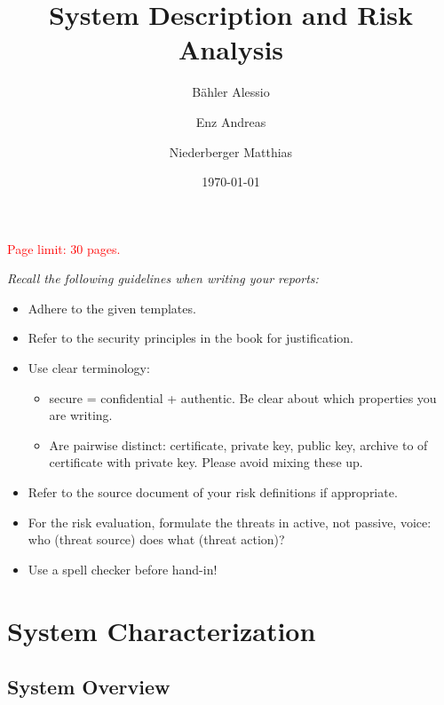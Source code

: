 \documentclass[english]{article}
\title{\huge\sffamily\bfseries System Description and Risk Analysis}
\author{B\"ahler Alessio \and Enz Andreas \and Niederberger Matthias}
\date{\today}
\begin{document}
\maketitle

\begin{center}
{\large\textcolor{red}{Page limit: 30 pages.}}
\end{center}

\tableofcontents
\pagebreak

\begin{framed}
\noindent
{\it
Recall the following guidelines when writing your reports:
\begin{itemize}
\item Adhere to the given templates.

\item Refer to the security principles in the book for justification.

\item Use clear terminology: 
\begin{itemize}
\item secure = confidential + authentic. Be clear about
which properties you are writing.
\item Are pairwise distinct: certificate, private key, public key, archive to of certificate with private key. Please avoid mixing these up.
\end{itemize}

\item Refer to the source document of your risk definitions if appropriate.

\item For the risk evaluation, formulate the threats in active, not passive, 
voice: who (threat source) does what (threat action)? 

\item Use a spell checker before hand-in!

\end{itemize}
}
\end{framed}


\section{System Characterization}

\subsection{System Overview}
\end{document}
